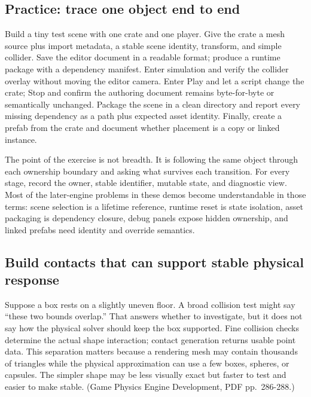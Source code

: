 \begin{allmightroleexercise}

\subsection{Practice: trace one object end to end}\label{06-engine-ii-ch033-practice-trace-one-object-end-to-end}

\hypertarget{06-engine-ii-ch033-practice-trace-one-object-end-to-end}{}

Build a tiny test scene with one crate and one player. Give the crate a mesh source plus import metadata, a stable scene identity, transform, and simple collider. Save the editor document in a readable format; produce a runtime package with a dependency manifest. Enter simulation and verify the collider overlay without moving the editor camera. Enter Play and let a script change the crate; Stop and confirm the authoring document remains byte-for-byte or semantically unchanged. Package the scene in a clean directory and report every missing dependency as a path plus expected asset identity. Finally, create a prefab from the crate and document whether placement is a copy or linked instance.

\end{allmightroleexercise}

The point of the exercise is not breadth. It is following the same object through each ownership boundary and asking what survives each transition. For every stage, record the owner, stable identifier, mutable state, and diagnostic view. Most of the later-engine problems in these demos become understandable in those terms: scene selection is a lifetime reference, runtime reset is state isolation, asset packaging is dependency closure, debug panels expose hidden ownership, and linked prefabs need identity and override semantics.

\subsection{Build contacts that can support stable physical response}\label{06-engine-ii-ch033-build-contacts-that-can-support-stable-physical-response}

\hypertarget{06-engine-ii-ch033-build-contacts-that-can-support-stable-physical-response}{}

Suppose a box rests on a slightly uneven floor. A broad collision test might say ``these two bounds overlap.'' That answers whether to investigate, but it does not say how the physical solver should keep the box supported. Fine collision checks determine the actual shape interaction; contact generation returns usable point data. This separation matters because a rendering mesh may contain thousands of triangles while the physical approximation can use a few boxes, spheres, or capsules. The simpler shape may be less visually exact but faster to test and easier to make stable. (Game Physics Engine Development, PDF pp.~286-288.)

